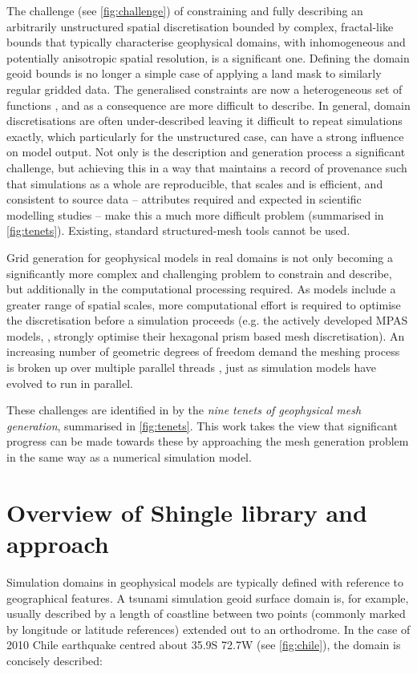 \documentclass[a4paper, 10pt]{book}
\begin{document}
The challenge (see \cref{fig:challenge})
of constraining and fully describing an
arbitrarily unstructured
spatial discretisation
bounded by complex, fractal-like bounds that typically characterise geophysical domains,
with inhomogeneous and potentially anisotropic spatial resolution,
is a significant one.
Defining the domain geoid bounds is no longer a simple case of applying a land mask to similarly regular gridded data.
%
The generalised constraints are now a heterogeneous set of functions \citep{candybrep},
and as a consequence are more difficult to describe.
%
%
In general, domain discretisations are often under-described leaving it difficult to repeat simulations exactly,
which particularly for the unstructured case, can have a strong influence on model output.
%
Not only is the description and generation process a significant challenge, but achieving this in a way
that maintains a record of provenance such that simulations as a whole are reproducible,
that scales and is efficient, and consistent to source data
-- attributes required and expected in scientific modelling studies --
make this a much more difficult problem (summarised in \cref{fig:tenets}).
Existing, standard structured-mesh tools cannot be used.


Grid generation for geophysical models in real domains is not only becoming a significantly more complex and challenging problem
to constrain and describe,
but additionally in the computational processing required.
%
%
As models include a greater range of spatial scales, more computational effort is required to optimise the discretisation before a simulation proceeds
(e.g. the actively developed MPAS models, \cite{ringler13}, strongly optimise their hexagonal prism based mesh discretisation).
%
An increasing number of geometric degrees of freedom demand the meshing process is broken up over multiple parallel threads
\citep[as demonstrated in][]{candybrep}, just as simulation models have evolved to run in parallel.
%

These challenges are identified in \cite{candybrep} by the \emph{nine tenets of geophysical mesh generation}, summarised in \cref{fig:tenets}.
This work takes the view that significant progress can be made towards these by approaching the mesh generation problem in the same way as a numerical simulation model.
%




\chapter{Overview of Shingle library and approach}
%
Simulation domains in geophysical models are typically defined with reference to geographical features.
A tsunami simulation geoid surface domain is, for example, usually described by a length of coastline between two points
(commonly marked by longitude or latitude references) extended out to an orthodrome.
%
In the case of 2010 Chile earthquake
centred about
35.9\degree S 72.7\degree W
(see \cref{fig:chile}),
the domain is concisely described:
\end{document}
